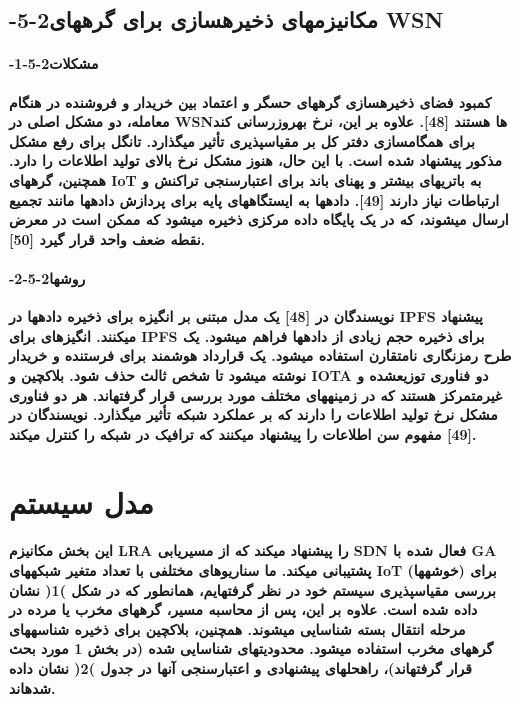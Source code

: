 \documentclass{article} %
\begin{document}
\noindent 
\subsection{ -5-2مکانیزمهای ذخیرهسازی برای گرههای WSN}

\noindent 
\paragraph{ -1-5-2مشکلات}

\noindent 
{\bf کمبود فضای ذخیرهسازی گرههای حسگر و اعتماد بین خریدار و فروشنده در هنگام معامله، دو مشکل اصلی در WSNها هستند [48]. علاوه بر این، نرخ بهروزرسانی کند برای همگامسازی دفتر کل بر مقیاسپذیری تأثیر میگذارد. تانگل برای رفع مشکل مذکور پیشنهاد شده است. با این حال، هنوز مشکل نرخ بالای تولید اطلاعات را دارد. همچنین، گرههای IoT به باتریهای بیشتر و پهنای باند برای اعتبارسنجی تراکنش و ارتباطات نیاز دارند [49]. دادهها به ایستگاههای پایه برای پردازش دادهها مانند تجمیع ارسال میشوند، که در یک پایگاه داده مرکزی ذخیره میشود که ممکن است در معرض نقطه ضعف واحد قرار گیرد [50].}

\noindent 
\paragraph{ -2-5-2روشها}

\noindent 
{\bf نویسندگان در [48] یک مدل مبتنی بر انگیزه برای ذخیره دادهها در IPFS پیشنهاد میکنند. انگیزهای برای IPFS برای ذخیره حجم زیادی از دادهها فراهم میشود. یک طرح رمزنگاری نامتقارن استفاده میشود. یک قرارداد هوشمند برای فرستنده و خریدار نوشته میشود تا شخص ثالث حذف شود. بلاکچین و IOTA دو فناوری توزیعشده و غیرمتمرکز هستند که در زمینههای مختلف مورد بررسی قرار گرفتهاند. هر دو فناوری مشکل نرخ تولید اطلاعات را دارند که بر عملکرد شبکه تأثیر میگذارد. نویسندگان در [49] مفهوم سن اطلاعات را پیشنهاد میکنند که ترافیک در شبکه را کنترل میکند.}


\section{ مدل سیستم }

\noindent 
{\bf این بخش مکانیزم LRA را پیشنهاد میکند که از مسیریابی SDN فعال شده با GA پشتیبانی میکند. ما سناریوهای مختلفی با تعداد متغیر شبکههای IoT (خوشهها) برای بررسی مقیاسپذیری سیستم خود در نظر گرفتهایم، همانطور که در شکل )1( نشان داده شده است. علاوه بر این، پس از محاسبه مسیر، گرههای مخرب یا مرده در مرحله انتقال بسته شناسایی میشوند. همچنین، بلاکچین برای ذخیره شناسههای گرههای مخرب استفاده میشود. محدودیتهای شناسایی شده (در بخش 1 مورد بحث قرار گرفتهاند)، راهحلهای پیشنهادی و اعتبارسنجی آنها در جدول )2( نشان داده شدهاند.}
\end{document}
